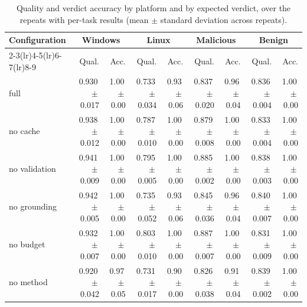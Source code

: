 \begin{table}[t]\centering\footnotesize
\caption{Quality and verdict accuracy by platform and by expected verdict, over the repeats with per-task results (mean $\pm$ standard deviation across repeats).}
\label{tab:breakdown}
\begin{tabular}{@{}l rrrrrrrr@{}}\toprule
Configuration & \multicolumn{2}{c}{Windows} & \multicolumn{2}{c}{Linux} & \multicolumn{2}{c}{Malicious} & \multicolumn{2}{c}{Benign}\\
\cmidrule(lr){2-3}\cmidrule(lr){4-5}\cmidrule(lr){6-7}\cmidrule(lr){8-9}
 & Qual. & Acc. & Qual. & Acc. & Qual. & Acc. & Qual. & Acc.\\\midrule
full & 0.930\,$\pm$\,0.017 & 1.00\,$\pm$\,0.00 & 0.733\,$\pm$\,0.034 & 0.93\,$\pm$\,0.06 & 0.837\,$\pm$\,0.020 & 0.96\,$\pm$\,0.04 & 0.836\,$\pm$\,0.004 & 1.00\,$\pm$\,0.00\\
no cache & 0.938\,$\pm$\,0.012 & 1.00\,$\pm$\,0.00 & 0.787\,$\pm$\,0.010 & 1.00\,$\pm$\,0.00 & 0.879\,$\pm$\,0.008 & 1.00\,$\pm$\,0.00 & 0.833\,$\pm$\,0.004 & 1.00\,$\pm$\,0.00\\
no validation & 0.941\,$\pm$\,0.009 & 1.00\,$\pm$\,0.00 & 0.795\,$\pm$\,0.005 & 1.00\,$\pm$\,0.00 & 0.885\,$\pm$\,0.002 & 1.00\,$\pm$\,0.00 & 0.838\,$\pm$\,0.003 & 1.00\,$\pm$\,0.00\\
no grounding & 0.942\,$\pm$\,0.005 & 1.00\,$\pm$\,0.00 & 0.735\,$\pm$\,0.052 & 0.93\,$\pm$\,0.06 & 0.845\,$\pm$\,0.036 & 0.96\,$\pm$\,0.04 & 0.840\,$\pm$\,0.007 & 1.00\,$\pm$\,0.00\\
no budget & 0.932\,$\pm$\,0.007 & 1.00\,$\pm$\,0.00 & 0.803\,$\pm$\,0.010 & 1.00\,$\pm$\,0.00 & 0.887\,$\pm$\,0.007 & 1.00\,$\pm$\,0.00 & 0.831\,$\pm$\,0.009 & 1.00\,$\pm$\,0.00\\
no method & 0.920\,$\pm$\,0.042 & 0.97\,$\pm$\,0.05 & 0.731\,$\pm$\,0.017 & 0.90\,$\pm$\,0.00 & 0.826\,$\pm$\,0.038 & 0.91\,$\pm$\,0.04 & 0.839\,$\pm$\,0.002 & 1.00\,$\pm$\,0.00\\
\bottomrule\end{tabular}\end{table}
